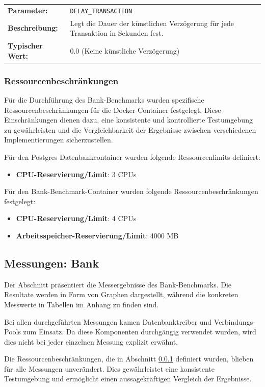 \documentclass[fontsize=12pt,paper=a4,twoside=semi,parskip=half-,headsepline,headinclude]{scrreprt}
\begin{document}
\begin{tabularx}{\textwidth}{@{}lX@{}}
	\textbf{Parameter:} & \texttt{DELAY\_TRANSACTION} \\
	\textbf{Beschreibung:} & Legt die Dauer der künstlichen Verzögerung für jede Transaktion in Sekunden fest. \\
	\textbf{Typischer Wert:} & 0.0 (Keine künstliche Verzögerung)
\end{tabularx}

\subsubsection{Ressourcenbeschränkungen}
\label{subsubsec:bankRes}

Für die Durchführung des Bank-Benchmarks wurden spezifische Ressourcenbe\-schrän\-kun\-gen für die Docker-Container festgelegt. Diese Einschränkungen dienen dazu, eine konsistente und kontrollierte Testumgebung zu gewährleisten und die Vergleichbarkeit der Ergebnisse zwischen verschiedenen Implementierungen sicherzustellen.

Für den Postgres-Datenbankcontainer wurden folgende Ressourcenlimits definiert:
\begin{itemize}
	\item \textbf{CPU-Reservierung/Limit}: 3 CPUs
\end{itemize}

Für den Bank-Benchmark-Container wurden folgende Ressourcenbeschränkungen festgelegt:
\begin{itemize}
	\item \textbf{CPU-Reservierung/Limit}: 4 CPUs
	\item \textbf{Arbeitsspeicher-Reservierung/Limit}: 4000 MB
\end{itemize}

\subsection{Messungen: Bank}

Der Abschnitt präsentiert die Messergebnisse des Bank-Benchmarks. Die Resultate werden in Form von Graphen dargestellt, während die konkreten Messwerte in Tabellen im Anhang zu finden sind.

Bei allen durchgeführten Messungen kamen Datenbanktreiber und Verbindungs-Pools zum Einsatz. Da diese Komponenten durchgängig verwendet wurden, wird dies nicht bei jeder einzelnen Messung explizit erwähnt.

Die Ressourcenbeschränkungen, die in Abschnitt \ref{subsubsec:bankRes} definiert wurden, blieben für alle Messungen unverändert. Dies gewährleistet eine konsistente Testumgebung und ermöglicht einen aussagekräftigen Vergleich der Ergebnisse.
\end{document}
